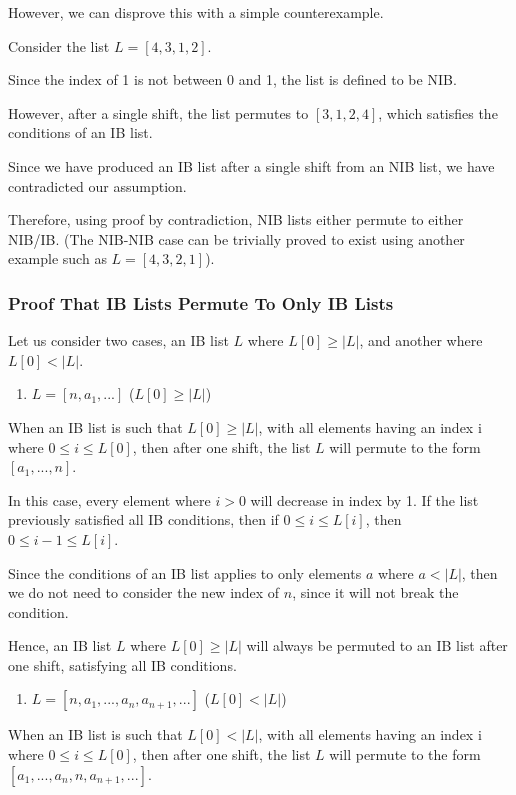 \documentclass[12pt]{article}
\begin{document}
However, we can disprove this with a simple counterexample.

Consider the list $L = [4, 3, 1, 2]$. 

Since the index of 1 is not between 0 and 1, the list is defined to be NIB.

However, after a single shift, the list permutes to $[3, 1, 2, 4]$, which satisfies the conditions of an IB list. 

Since we have produced an IB list after a single shift from an NIB list, we have contradicted our assumption.

Therefore, using proof by contradiction, NIB lists either permute to either NIB/IB. (The NIB-NIB case can be trivially proved to exist using another example such as $L = [4,3,2,1]$).

\subsubsection{Proof That IB Lists Permute To Only IB Lists}

Let us consider two cases, an IB list $L$ where $L[0] \geq |L|$, and another where $L[0] < |L|$.

\begin{enumerate}[start=1]
    \item $L = [n, a_1, ...] $ ($L[0] \geq |L|$)
\end{enumerate}

When an IB list is such that $L[0] \geq |L|$, with all elements having an index i where $0 \leq i \leq L[0]$, then after one shift, the list $L$ will permute to the form $[a_1, ..., n]$.

In this case, every element where $i>0$ will decrease in index by 1. If the list previously satisfied all IB conditions, then if $0 \leq i \leq L[i]$, then $0 \leq i-1 \leq L[i]$.

Since the conditions of an IB list applies to only elements $a$ where $a<|L|$, then we do not need to consider the new index of $n$, since it will not break the condition.

Hence, an IB list $L$ where $L[0] \geq |L|$ will always be permuted to an IB list after one shift, satisfying all IB conditions.

\begin{enumerate}[start=2]
    \item $L = [n, a_1, ..., a_n, a_{n+1},...]$ ($L[0] < |L|$)
\end{enumerate}

When an IB list is such that $L[0] < |L|$, with all elements having an index i where $0 \leq i \leq L[0]$, then after one shift, the list $L$ will permute to the form $[a_1, ..., a_n, n, a_{n+1}, ...]$.
\end{document}
